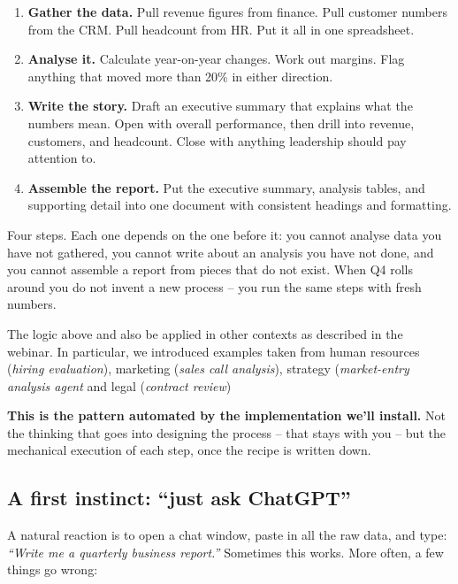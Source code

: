 \documentclass[12pt, a4paper]{article}
\begin{document}
\begin{enumerate}[leftmargin=1.5em]
  \item \textbf{Gather the data.} Pull revenue figures from finance. Pull customer numbers from the CRM. Pull headcount from HR. Put it all in one spreadsheet.
  \item \textbf{Analyse it.} Calculate year-on-year changes. Work out margins. Flag anything that moved more than 20\% in either direction.
  \item \textbf{Write the story.} Draft an executive summary that explains what the numbers mean. Open with overall performance, then drill into revenue, customers, and headcount. Close with anything leadership should pay attention to.
  \item \textbf{Assemble the report.} Put the executive summary, analysis tables, and supporting detail into one document with consistent headings and formatting.
\end{enumerate}

Four steps. Each one depends on the one before it: you cannot analyse data you have not gathered, you cannot write about an analysis you have not done, and you cannot assemble a report from pieces that do not exist. When Q4 rolls around you do not invent a new process -- you run the same steps with fresh numbers.

The logic above and also be applied in other contexts as described in the webinar. In particular, we introduced examples taken from human resources (\textit{hiring evaluation}), marketing (\textit{sales call analysis}), strategy (\textit{market-entry analysis agent} and legal (\textit{contract review})

\begin{notebox}
\textbf{This is the pattern automated by the implementation we'll install.} Not the thinking that goes into designing the process -- that stays with you -- but the mechanical execution of each step, once the recipe is written down.
\end{notebox}

\subsection{A first instinct: ``just ask ChatGPT''}

A natural reaction is to open a chat window, paste in all the raw data, and type: \textit{``Write me a quarterly business report.''} Sometimes this works. More often, a few things go wrong:
\end{document}
